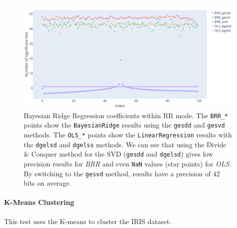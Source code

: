 \documentclass[11pt]{article}
\begin{document}
\begin{figure}
    \centering
    \includegraphics[width=\linewidth]{figure/BRR/BRR_coefs_sig.pdf}
    \caption{Bayesian Ridge Regression coefficients within RR mode.
    The \texttt{BRR\_*} points show the \texttt{BayesianRidge} results
    using the \texttt{gesdd} and \texttt{gesvd} methods. 
    The \texttt{OLS\_*} points show the \texttt{LinearRegression} results
    with the \texttt{dgelsd} and \texttt{dgelss} methods.
    We can see that using the Divide \& Conquer method for the SVD
    (\texttt{gesdd} and  \texttt{dgelsd})
    gives low precision
    results for \textit{BRR} and even \texttt{NaN} values (star points) for \textit{OLS}. By switching to the \texttt{gesvd} method, 
    results have a precision of 42 bits on average.
    }
    \label{fig:brr_svd_sig}
\end{figure}



\paragraph{K-Means Clustering}

This test uses the K-means to cluster the IRIS dataset.
\end{document}
